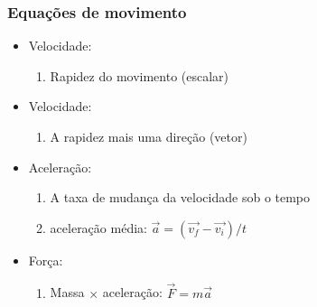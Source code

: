 \begin{frame}
\frametitle{Equações de movimento}

  \begin{itemize}[<+-| alert@+>]
    \item Velocidade:
      \begin{enumerate}[<+-| alert@+>]
        \item Rapidez do movimento (escalar)
      \end{enumerate}
    \item Velocidade:
      \begin{enumerate}[<+-| alert@+>]
        \item A rapidez mais uma direção (vetor)
      \end{enumerate}
    \item Aceleração:
      \begin{enumerate}[<+-| alert@+>]
        \item A taxa de mudança da velocidade sob o tempo
        \item aceleração média: $\vec{a} = (\vec{v_f} - \vec{v_i})/t$
      \end{enumerate}
    \item Força:
      \begin{enumerate}[<+-| alert@+>]
        \item Massa $\times$ aceleração: $\vec{F} = m\vec{a}$
      \end{enumerate}
  \end{itemize}
\end{frame}


